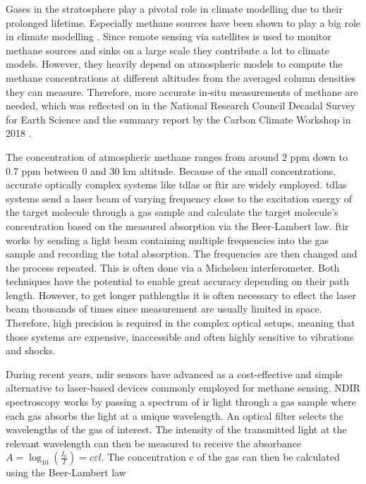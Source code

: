 \documentclass[
  a4paper,
  11pt,
  openany,
  parskip,
  toc=totoc,
  listof=totoc,
  bibliography=totoc
]{scrreprt}
\begin{document}
Gases in the stratosphere play a pivotal role in climate modelling due to their prolonged lifetime.
Especially methane sources have been shown to play a big role in climate modelling \cite{stocker2013, saunois2017, nisbet2019, turner2019}. Since remote sensing via satellites is used to monitor methane sources and sinks on a large scale they contribute a lot to climate models. However, they heavily depend on atmospheric models to compute the methane concentrations at different altitudes from the averaged column densities they can measure. Therefore, more accurate in-situ measurements of methane are needed, which was reflected on in the National Research Council Decadal Survey for Earth Science \cite{national2019} and the summary report by the Carbon Climate Workshop in 2018 \cite{sellers2018}. 

The concentration of atmospheric methane ranges from around 2 ppm down to 0.7 ppm between 0 and 30 km altitude.
Because of the small concentrations, accurate optically complex systems like \gls{tdlas} \cite{joly2020} or \gls{ftir} \cite{runge2023} are widely employed.
\gls{tdlas} systems send a laser beam of varying frequency close to the excitation energy of the target molecule through a gas sample and calculate the target molecule's concentration based on the measured absorption via the Beer-Lambert law.
\gls{ftir} works by sending a light beam containing multiple frequencies into the gas sample and recording the total absorption.
The frequencies are then changed and the process repeated.
This is often done via a Michelsen interferometer.
Both techniques have the potential to enable great accuracy depending on their path length. However, to get longer pathlengths it is often necessary to eflect the laser beam thousands of times since measurement are usually limited in space. Therefore, high precision is required in the complex optical setups, meaning that those systems are expensive, inaccessible and often highly sensitive to vibrations and shocks.

During recent years, \gls{ndir} sensors have advanced as a cost-effective and simple alternative to laser-based devices commonly employed for methane sensing.
NDIR spectroscopy works by passing a spectrum of \gls{ir} light through a gas sample where each gas absorbs the light at a unique wavelength.
An optical filter selects the wavelengths of the gas of interest.
The intensity of the transmitted light at the relevant wavelength can then be measured to receive the absorbance $A=\log_{10}\left(\frac{I_0}{I}\right) = c\varepsilon l$.
The concentration c of the gas can then be calculated using the Beer-Lambert law
\end{document}

